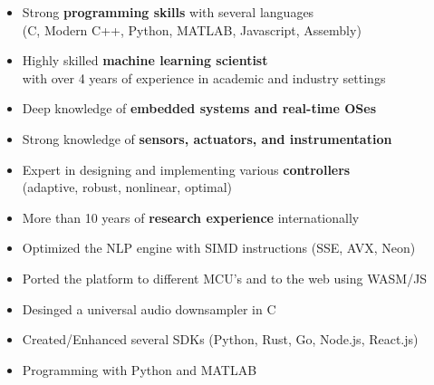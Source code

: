 \documentclass[10pt,letterpaper,ragged2e,compact]{mocv}
\begin{document}
\begin{paracol}{2}
    \begin{itemize}
        \item Strong \textbf{programming skills} with several languages \\
            (C, Modern C++, Python, MATLAB, Javascript, Assembly)
        \item Highly skilled \textbf{machine learning scientist} \\
            with over 4 years of experience in academic and industry settings
        \item Deep knowledge of \textbf{embedded systems and real-time OSes} \\
        \item Strong knowledge of \textbf{sensors, actuators, and instrumentation}
        \item Expert in designing and implementing various \textbf{controllers} \\
            (adaptive, robust, nonlinear, optimal)
        \item More than 10 years of \textbf{research experience} internationally
    \end{itemize}
    \begin{itemize}
        \item Optimized the NLP engine with SIMD instructions (SSE, AVX, Neon)
        \item Ported the platform to different MCU's and to the web using WASM/JS
        \item Desinged a universal audio downsampler in C
        \item Created/Enhanced several SDKs (Python, Rust, Go, Node.js, React.js)
    \end{itemize}
    \divider
    \begin{itemize}
        \item Programming with Python and MATLAB
    \end{itemize}
    \divider

\end{paracol}
\end{document}
